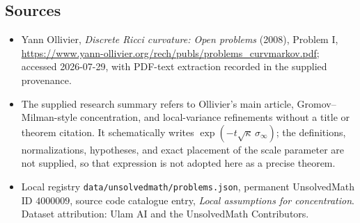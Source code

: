 \documentclass[11pt]{article}
\begin{document}
\subsection{Sources}
\begin{itemize}
\item Yann Ollivier, \emph{Discrete Ricci curvature: Open problems} (2008), Problem I, \url{https://www.yann-ollivier.org/rech/publs/problems_curvmarkov.pdf}; accessed 2026-07-29, with PDF-text extraction recorded in the supplied provenance.
\item The supplied research summary refers to Ollivier's main article, Gromov--Milman-style concentration, and local-variance refinements without a title or theorem citation. It schematically writes $\exp(-t\sqrt{\kappa}\,\sigma_\infty)$; the definitions, normalizations, hypotheses, and exact placement of the scale parameter are not supplied, so that expression is not adopted here as a precise theorem.
\item Local registry \texttt{data/unsolvedmath/problems.json}, permanent UnsolvedMath ID $4000009$, source code catalogue entry, \emph{Local assumptions for concentration}. Dataset attribution: Ulam AI and the UnsolvedMath Contributors.
\end{itemize}
\end{document}

